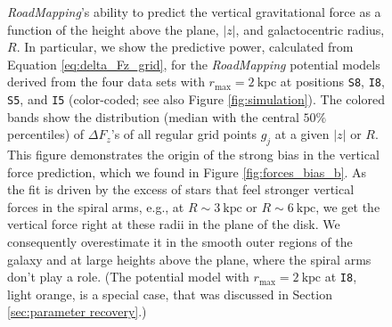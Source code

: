 \documentclass[iop,revtex4,numberedappendix,appendixfloats]{emulateapj}
\newcommand{\RM}{{\sl RoadMapping}}
\begin{document}
\begin{figure}[!htbp]
\centering
\caption{\RM{}'s ability to predict the vertical gravitational force as a function of the height above the plane, $|z|$, and galactocentric radius, $R$. In particular, we show the predictive power, calculated from Equation \eqref{eq:delta_Fz_grid}, for the \RM{} potential models derived from the four data sets with $r_\text{max}=2~\text{kpc}$ at positions \texttt{S8}, \texttt{I8}, \texttt{S5}, and \texttt{I5} (color-coded; see also Figure \ref{fig:simulation}). The colored bands show the distribution (median with the central $50\%$ percentiles) of $\Delta F_z$'s of all regular grid points $g_j$ at a given $|z|$ or $R$. This figure demonstrates the origin of the strong bias in the vertical force prediction, which we found in Figure \ref{fig:forces_bias_b}. As the fit is driven by the excess of stars that feel stronger vertical forces in the spiral arms, e.g., at $R\sim3~\text{kpc}$ or $R\sim6~\text{kpc}$, we get the vertical force right at these radii in the plane of the disk. We consequently overestimate it in the smooth outer regions of the galaxy and at large heights above the plane, where the spiral arms don't play a role. (The potential model with $r_\text{max}=2~\text{kpc}$ at \texttt{I8}, light orange, is a special case, that was discussed in Section \ref{sec:parameter recovery}.)}
\label{fig:Fg_vs_z_and_R}
\end{figure}
\end{document}
